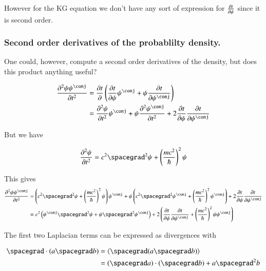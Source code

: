 \documentclass{article}
\newcommand{\PDSq}[2]{\frac{\partial^2 {#2}}{\partial {#1}^2}}
\begin{document}
However for the KG equation we don't have any sort of expression for $\frac{\partial{t}}{\partial {\psi}}$ since it is second order.

\subsubsection{ Second order derivatives of the probablilty density. }

One could, however, compute a second order derivatives of the density, but does this product anything useful?

\begin{align*}
\PDSq{t}{\psi\psi^\conj} 
&= \PD{t}{}\left( \PD{t}{\psi}\psi^\conj + \psi \PD{t}{\psi^\conj} \right) \\
&= 
\PDSq{t}{\psi}\psi^\conj 
+ \psi \PDSq{t}{\psi^\conj} 
+ 2 \PD{t}{\psi}\PD{t}{\psi^\conj} 
\\
\end{align*}

But we have 

\begin{align*}
\PDSq{t}{\psi} = c^2 \spacegrad^2 \psi + \left(\frac{m c^2}{\hbar} \right)^2 \psi
\end{align*}

This gives
\begin{align*}
\PDSq{t}{\psi\psi^\conj} 
&= 
\left( c^2 \spacegrad^2 \psi + \left(\frac{m c^2}{\hbar} \right)^2 \psi \right) \psi^\conj 
+ \psi \left( c^2 \spacegrad^2 \psi^\conj + \left(\frac{m c^2}{\hbar} \right)^2 \psi^\conj \right)
+ 2 \PD{t}{\psi}\PD{t}{\psi^\conj} 
\\
&= 
c^2 \left( \psi^\conj \spacegrad^2 \psi + \psi \spacegrad^2 \psi^\conj \right)
+ 2 \left( 
\PD{t}{\psi}\PD{t}{\psi^\conj} + \left( \frac{m c^2}{\hbar} \right)^2 \psi \psi^\conj 
\right)
\\
\end{align*}

The first two Laplacian terms can be expressed as divergences with

\begin{align*}
\spacegrad \cdot (a \spacegrad b) 
&= 
\gpgradezero{ \spacegrad (a \spacegrad b) } \\
&= 
(\spacegrad a) \cdot (\spacegrad b) + a \spacegrad^2 b
\end{align*}
\end{document}
